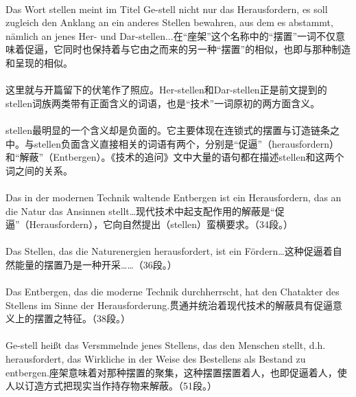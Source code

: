 \documentclass{article}
\begin{document}
			\paragraph{}
			Das Wort stellen meint im Titel Ge-stell nicht nur das Herausfordern, es soll zugleich den Anklang an ein anderes Stellen bewahren, aus dem es abstammt, nämlich an jenes Her- und Dar-stellen...在“座架”这个名称中的“摆置”一词不仅意味着促逼，它同时也保持着与它由之而来的另一种“摆置”的相似，也即与那种制造和呈现的相似。
			\paragraph{}
			这里就与开篇留下的伏笔作了照应。Her-stellen和Dar-stellen正是前文提到的stellen词族两类带有正面含义的词语，也是“技术”一词原初的两方面含义。
			
			
			\paragraph{}
			stellen最明显的一个含义却是负面的。它主要体现在连锁式的摆置与订造链条之中。与stellen负面含义直接相关的词语有两个，分别是“促逼”（herausfordern）和“解蔽”（Entbergen）。《技术的追问》文中大量的语句都在描述stellen和这两个词之间的关系。
			\paragraph{}
			Das in der modernen Technik waltende Entbergen ist ein Herausfordern, das an die Natur das Ansinnen stellt…现代技术中起支配作用的解蔽是“促逼”（Herausfordern），它向自然提出（stellen）蛮横要求。（34段。）
			\paragraph{}
			Das Stellen, das die Naturenergien herausfordert, ist ein Fördern…这种促逼着自然能量的摆置乃是一种开采……（36段。）
			\paragraph{}	
			Das Entbergen, das die moderne Technik durchherrscht, hat den Chatakter des Stellens im Sinne der Herausforderung.贯通并统治着现代技术的解蔽具有促逼意义上的摆置之特征。（38段。）	
			\paragraph{}
			Ge-stell heißt das Versmmelnde jenes Stellens, das den Menschen stellt, d.h. herausfordert, das Wirkliche in der Weise des Bestellens als Bestand zu entbergen.座架意味着对那种摆置的聚集，这种摆置摆置着人，也即促逼着人，使人以订造方式把现实当作持存物来解蔽。（51段。）
\end{document}
